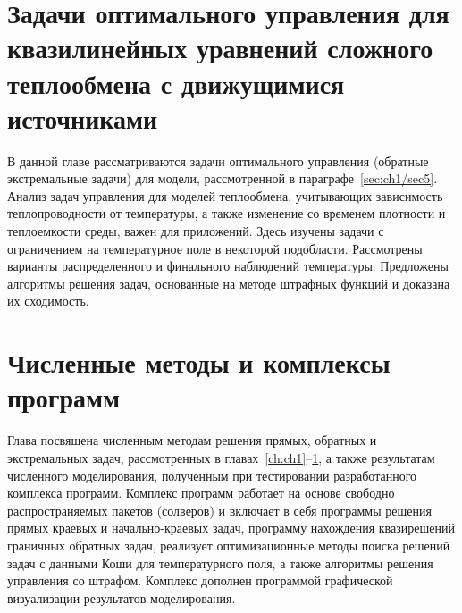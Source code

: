 \documentclass[a4paper,14pt,oneside,openany]{memoir}
\begin{document}
    \chapter{Задачи оптимального управления для квазилинейных уравнений сложного теплообмена с движущимися источниками}
    \label{ch:ch3}
    В данной главе рассматриваются задачи оптимального управления (обратные
    экстремальные задачи) для модели, рассмотренной в параграфе~\ref{sec:ch1/sec5}.
    Анализ задач управления для моделей теплообмена, учитывающих зависимость
    теплопроводности от температуры, а также изменение со временем
    плотности и теплоемкости среды, важен для приложений.
    Здесь изучены задачи с ограничением на температурное поле в некоторой подобласти.
    Рассмотрены варианты распределенного и финального наблюдений температуры.
    Предложены алгоритмы решения задач, основанные на методе
    штрафных функций и доказана их сходимость.
%    
    
    


    \chapter{Численные методы и комплексы программ}\label{ch:ch4}
    Глава посвящена численным методам решения прямых, обратных и экстремальных задач,
    рассмотренных в главах~\ref{ch:ch1}--\ref{ch:ch3}, а также результатам численного моделирования,
    полученным при тестировании разработанного комплекса программ.
    Комплекс программ работает на основе свободно
    распространяемых пакетов (солверов) и включает в себя программы
    решения прямых краевых и начально-краевых задач, программу нахождения
    квазирешений граничных обратных задач, реализует оптимизационные
    методы поиска решений задач с данными Коши для температурного поля, а %
    также алгоритмы решения управления со штрафом.
    Комплекс дополнен программой графической визуализации результатов моделирования.
    
    
    


    \setcounter{totalchapter}{\value{chapter}} %

    \appendix
    \setlength{\midchapskip}{20pt}
    \renewcommand*{\afterchapternum}{\par\nobreak\vskip \midchapskip}
    \renewcommand\thechapter{\Asbuk{chapter}} %


    \setcounter{totalappendix}{\value{chapter}} %
\end{document}
